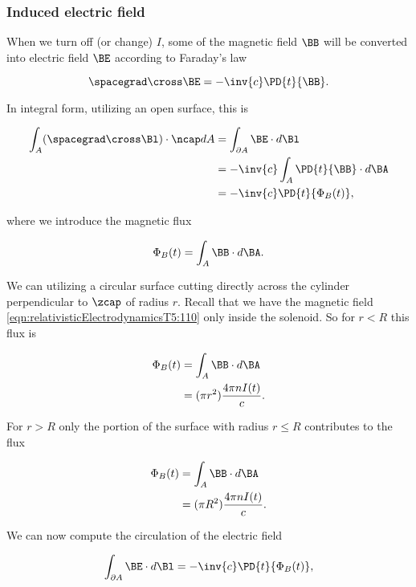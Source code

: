 \subsubsection{Induced electric field}

When we turn off (or change) $I$, some of the magnetic field $\BB$ will be converted into electric field $\BE$ according to Faraday's law

\begin{equation}\label{eqn:relativisticElectrodynamicsT5:290}
\spacegrad \cross \BE = - \inv{c} \PD{t}{\BB}.
\end{equation}

In integral form, utilizing an open surface, this is

\begin{align*}
\int_A (\spacegrad \cross \Bl) \cdot \ncap dA
&=
\int_{\partial A} \BE \cdot d\Bl \\
&= - \inv{c} \int_A \PD{t}{\BB} \cdot d\BA \\
&= - \inv{c} \PD{t}{\Phi_B(t)},
\end{align*}

where we introduce the magnetic flux

\begin{equation}\label{eqn:relativisticElectrodynamicsT5:291}
\Phi_B(t) = \int_A \BB \cdot d\BA.
\end{equation}

We can utilizing a circular surface cutting directly across the cylinder perpendicular to $\zcap$ of radius $r$.  Recall that we have the magnetic field \ref{eqn:relativisticElectrodynamicsT5:110} only inside the solenoid.  So for $r < R$ this flux is

\begin{align*}
\Phi_B(t)
&= \int_A \BB \cdot d\BA \\
&= (\pi r^2) \frac{4 \pi n I(t)}{c}.
\end{align*}

For $r > R$ only the portion of the surface with radius $r \le R$ contributes to the flux

\begin{align*}
\Phi_B(t)
&= \int_A \BB \cdot d\BA \\
&= (\pi R^2) \frac{4 \pi n I(t)}{c}.
\end{align*}

We can now compute the circulation of the electric field

\begin{equation}\label{eqn:relativisticElectrodynamicsT5:292}
\int_{\partial A} \BE \cdot d\Bl = - \inv{c} \PD{t}{\Phi_B(t)},
\end{equation}

